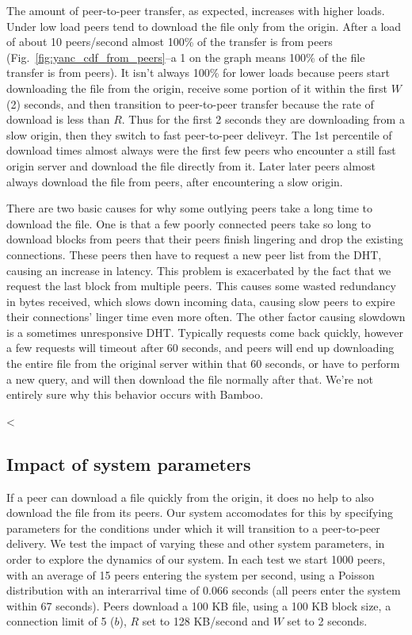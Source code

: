 The amount of peer-to-peer transfer, as expected, increases with higher loads. Under low load peers tend to download 
the file only from the origin.  After a load of about 10 peers/second almost 100\% of the transfer is from peers (Fig.~\ref{fig:yanc_cdf_from_peers}--a 1 on the graph means 100\% of the file 
transfer is from peers). It isn't always 100\% for lower loads because peers start 
downloading the file from the origin, receive some portion of it within the first $W$ (2) seconds, and then
transition to peer-to-peer transfer because the rate of download is less than $R$.  
Thus for the first 2 seconds they are downloading from a slow origin, then they switch to fast peer-to-peer deliveyr.
The 1st percentile of download times almost always were the first few peers who encounter a still fast origin server and download the file directly from it.
Later later peers almost always download the file from peers, after encountering a slow origin.

There are two basic causes for why some outlying peers take a long time to download the file.  One is that a few poorly connected peers take so long to download blocks from peers
that their peers finish lingering and drop the existing connections.  These peers then have to request a new 
peer list from the DHT, causing an increase in latency.  This problem is exacerbated by the fact that we request 
the last block from multiple peers.  This causes 
some wasted redundancy in bytes received, which slows down incoming data, causing slow peers to expire their connections' linger time even more often.
The other factor causing slowdown is a sometimes unresponsive DHT. Typically requests come back quickly, however a few requests will timeout after 60 seconds, 
and peers will end up downloading the entire file from the original server within that 60 seconds, or have to perform a new 
query, and will then download the file normally after that.  We're not entirely sure why this behavior occurs with Bamboo.

<%

\subsection{Impact of system parameters}

If a peer can download a file quickly from the origin, it does no help to also download the file from its
peers. Our system accomodates for this by specifying parameters for the conditions under which it will 
transition to a peer-to-peer delivery. We test the impact of varying these and other system parameters, in order 
to explore the dynamics of our system. In each test we start 1000 peers, with an average of 15 peers entering 
the system per second, using a Poisson distribution with an interarrival time of 0.066 seconds (all peers enter the system within 67 seconds). 
Peers download a 100 KB file, using a 100 KB block size, a connection limit of 5 ($b$), $R$ set to 128 KB/second and $W$ set to 2 seconds.

